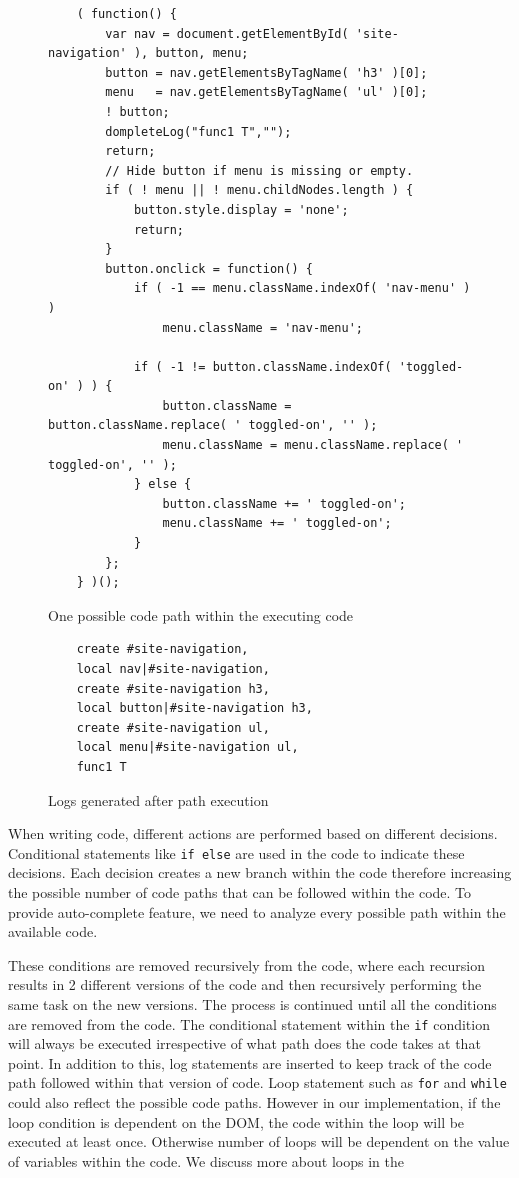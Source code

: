 		
		\begin{figure}
			\medskip
			\begin{lstlisting}
	( function() {
		var nav = document.getElementById( 'site-navigation' ), button, menu;
		button = nav.getElementsByTagName( 'h3' )[0];
		menu   = nav.getElementsByTagName( 'ul' )[0];
		! button;
		dompleteLog("func1 T","");
		return;
		// Hide button if menu is missing or empty.
		if ( ! menu || ! menu.childNodes.length ) {
			button.style.display = 'none';
			return;
		}
		button.onclick = function() {
			if ( -1 == menu.className.indexOf( 'nav-menu' ) )
				menu.className = 'nav-menu';

			if ( -1 != button.className.indexOf( 'toggled-on' ) ) {	
				button.className = button.className.replace( ' toggled-on', '' );
				menu.className = menu.className.replace( ' toggled-on', '' );
			} else {
				button.className += ' toggled-on';
				menu.className += ' toggled-on';
			}
		};
	} )();
			\end{lstlisting}
			\caption{One possible code path within the executing code}
			\label{Fig:Path}
			\end{figure}
			
			
			\begin{figure}
			\medskip
			\begin{lstlisting}
	create #site-navigation, 
	local nav|#site-navigation, 
	create #site-navigation h3, 
	local button|#site-navigation h3, 
	create #site-navigation ul, 
	local menu|#site-navigation ul, 
	func1 T 
			\end{lstlisting}
			\caption{Logs generated after path execution}
			\label{Fig:Logs}
			\end{figure}
			
		
		When writing code, different actions are performed based on different decisions. Conditional statements like \texttt{if else} are used in the code to indicate these decisions. Each decision creates a new branch within the code therefore increasing the possible number of code paths that can be followed within the code. To provide auto-complete feature, we need to analyze every possible path within the available \javascript code.
		
		These conditions are removed recursively from the code, where each recursion results in 2 different versions of the code and then recursively performing the same task on the new versions. The process is continued until all the conditions are removed from the code. The conditional statement within the \texttt{if} condition will always be executed irrespective of what path does the code takes at that point. In addition to this, log statements are inserted to keep track of the code path followed within that version of code. Loop statement such as \texttt{for} and \texttt{while} could also reflect the possible code paths. However in our implementation, if the loop condition is dependent on the DOM, the code within the loop will be executed at least once. Otherwise number of loops will be dependent on the value of variables within the code. We discuss more about loops in the 
		
